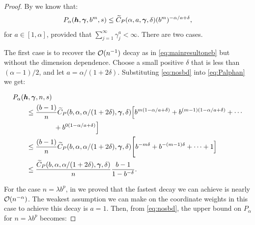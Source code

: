 \documentclass[authoryear]{elsarticle}
\begin{document}
\begin{proof}
By \cite[Theorem 2, case (iii)]{HicNie03a} we know that:
\begin{equation} \label{eq:nosbd}
      P_\alpha(\boldsymbol{h},\boldsymbol{\gamma},b^m,s)
        \leq \widetilde{C}_P(\alpha, a, \boldsymbol{\gamma}, \delta) (b^m)^{-\alpha/a + \delta},
\end{equation}
for $a \in [1, \alpha]$, provided that  $\sum_{j = 1}^{\infty} \gamma_j^a < \infty$. There are two cases.

The first case is to recover the $\operatorname{{\mathcal O}}(n^{-1})$ decay as in \eqref{eq:mainresultoneb} but without the dimension dependence.  Choose a small positive $\delta$ that is less than $(\alpha -1)/2$, and let $a = \alpha/(1 + 2\delta)$.   
Substituting \eqref{eq:nosbd} into \eqref{eq:Palphan} we get: %

\begin{align*}
    \MoveEqLeft{P_\alpha(\vh, \vgamma, n, s)} \\
    &\leq \frac{(b - 1)}{n} \widetilde{C}_P(b,\alpha, \alpha/(1 + 2\delta), \vgamma, \delta)  \Bigl[
        b^{m(1-\alpha/a + \delta)} + b^{(m-1)(1-\alpha/a + \delta)} + \cdots \\
        & \qquad \qquad 
     + b^{0(1-\alpha/a+ \delta)} \Bigr] \\
    &\leq \frac{(b - 1)}{n} \widetilde{C}_P(b,\alpha, \alpha/(1 + 2\delta), \vgamma, \delta)  \Bigg[ 
        b^{-m \delta} + b^{-(m-1)\delta} + \cdots + 1 \Big] \\
    &\leq \frac{\widetilde{C}_P(b,\alpha, \alpha/(1 + 2\delta), \vgamma, \delta)}{n} \frac{b - 1 }{1 - b^{-\delta}}.
\end{align*}

For the case $n = \lambda b^p$, in  we proved that the fastest decay we can achieve is nearly $\operatorname{{\mathcal O}}(n^{-\alpha})$. The weakest assumption we can make on the coordinate weights in this case to achieve this decay is  $a = 1$. Then, from \eqref{eq:nosbd}, the upper bound on $P_\alpha$ for $n = \lambda b^p$ becomes: 


\end{proof}
\end{document}
